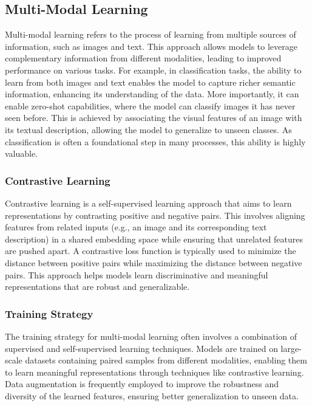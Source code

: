 \subsection{Multi-Modal Learning}
\label{subsec:multi_modal_learning}
Multi-modal learning refers to the process of learning from multiple sources of information, such as images and text. This approach allows models to leverage complementary information from different modalities, leading to improved performance on various tasks. For example, in classification tasks, the ability to learn from both images and text enables the model to capture richer semantic information, enhancing its understanding of the data. More importantly, it can enable zero-shot capabilities, where the model can classify images it has never seen before. This is achieved by associating the visual features of an image with its textual description, allowing the model to generalize to unseen classes. As classification is often a foundational step in many processes, this ability is highly valuable.

\subsubsection{Contrastive Learning}
\label{subsec:contrastive_learning}
Contrastive learning is a self-supervised learning approach that aims to learn representations by contrasting positive and negative pairs. This involves aligning features from related inputs (e.g., an image and its corresponding text description) in a shared embedding space while ensuring that unrelated features are pushed apart. A contrastive loss function is typically used to minimize the distance between positive pairs while maximizing the distance between negative pairs. This approach helps models learn discriminative and meaningful representations that are robust and generalizable.

\subsubsection{Training Strategy}
\label{subsec:training_strategy}
The training strategy for multi-modal learning often involves a combination of supervised and self-supervised learning techniques. Models are trained on large-scale datasets containing paired samples from different modalities, enabling them to learn meaningful representations through techniques like contrastive learning. Data augmentation is frequently employed to improve the robustness and diversity of the learned features, ensuring better generalization to unseen data.

